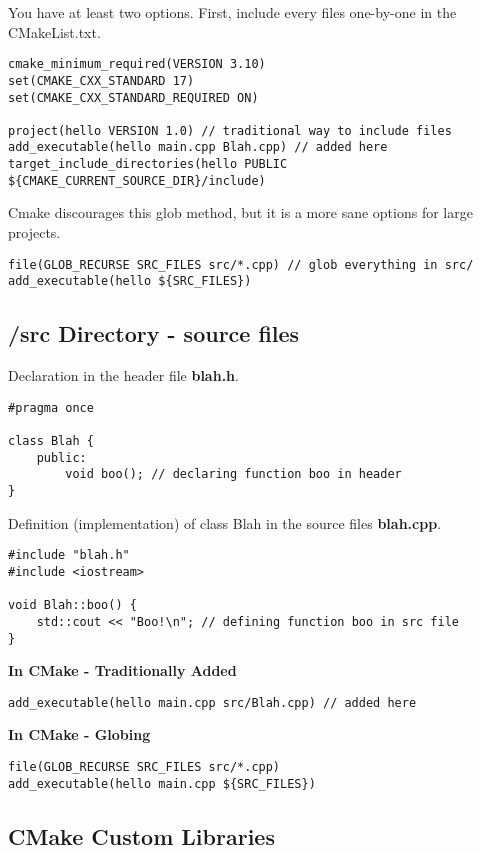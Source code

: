 \documentclass[openany]{report}
\begin{document}
You have at least two options. First, include every files one-by-one in the CMakeList.txt.
\begin{verbatim}
cmake_minimum_required(VERSION 3.10)
set(CMAKE_CXX_STANDARD 17)
set(CMAKE_CXX_STANDARD_REQUIRED ON)

project(hello VERSION 1.0) // traditional way to include files
add_executable(hello main.cpp Blah.cpp) // added here
target_include_directories(hello PUBLIC ${CMAKE_CURRENT_SOURCE_DIR}/include)
\end{verbatim}

Cmake discourages this glob method, but it is a more sane options for large projects.

\begin{verbatim}
file(GLOB_RECURSE SRC_FILES src/*.cpp) // glob everything in src/
add_executable(hello ${SRC_FILES})
\end{verbatim}

\subsection{/src Directory - source files}

Declaration in the header file \textbf{blah.h}.
\begin{verbatim}
#pragma once

class Blah {
    public:
        void boo(); // declaring function boo in header
}
\end{verbatim}

Definition (implementation) of class Blah in the source files \textbf{blah.cpp}.
\begin{verbatim}
#include "blah.h"
#include <iostream>

void Blah::boo() {
    std::cout << "Boo!\n"; // defining function boo in src file
}
\end{verbatim}

\textbf{In CMake - Traditionally Added}
\begin{verbatim}
add_executable(hello main.cpp src/Blah.cpp) // added here
\end{verbatim}

\textbf{In CMake - Globing}
\begin{verbatim}
file(GLOB_RECURSE SRC_FILES src/*.cpp)
add_executable(hello main.cpp ${SRC_FILES})
\end{verbatim}

\subsection{CMake Custom Libraries}
\end{document}
